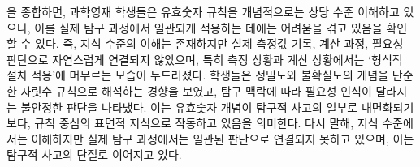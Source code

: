 을 종합하면,
%
과학영재 학생들은 유효숫자 규칙을 개념적으로는 상당 수준 이해하고 있으나,
이를 실제 탐구 과정에서 일관되게 적용하는 데에는 어려움을 겪고 있음을 확인할 수 있다.
%
즉, 지식 수준의 이해는 존재하지만 실제 측정값 기록, 계산 과정, 필요성 판단으로
자연스럽게 연결되지 않았으며, 특히 측정 상황과 계산 상황에서는 `형식적 절차 적용'에
머무르는 모습이 두드러졌다.
%
학생들은 정밀도와 불확실도의 개념을 단순한 자릿수 규칙으로 해석하는 경향을 보였고,
탐구 맥락에 따라 필요성 인식이 달라지는 불안정한 판단을 나타냈다.
%
이는 유효숫자 개념이 탐구적 사고의 일부로 내면화되기보다,
규칙 중심의 표면적 지식으로 작동하고 있음을 의미한다.
%
다시 말해, 지식 수준에서는 이해하지만 실제 탐구 과정에서는 일관된 판단으로 연결되지 못하고 있으며,
이는 탐구적 사고의 단절로 이어지고 있다.
